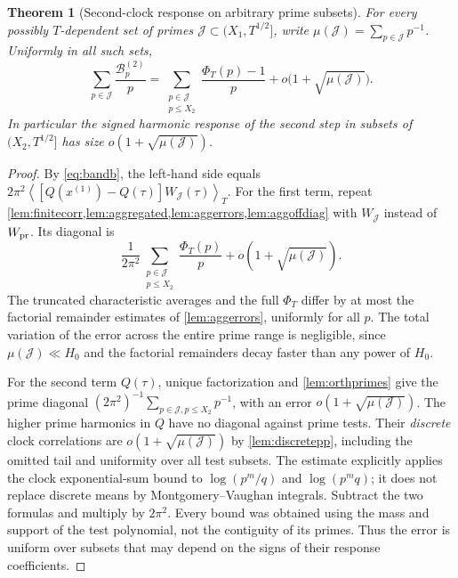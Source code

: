 \documentclass[11pt,reqno]{amsart}
\numberwithin{equation}{section}
\newtheorem{theorem}{Theorem}[section]
\newcommand{\av}[1]{\left\langle #1\right\rangle_T}
\begin{document}
\begin{theorem}[Second-clock response on arbitrary prime subsets]
\label{thm:secondresponse}
For every possibly $T$-dependent set of primes
$\mathcal J\subset(X_1,T^{1/2}]$, write
$\mu(\mathcal J)=\sum_{p\in\mathcal J}p^{-1}$.  Uniformly in
\emph{all} such sets,
\begin{equation}\label{eq:secondresponse}
\sum_{p\in\mathcal J}\frac{\mathcal B_p^{(2)}}p
=\sum_{\substack{p\in\mathcal J\\p\le X_2}}
\frac{\Phi_T(p)-1}{p}
 +o\bigl(1+\sqrt{\mu(\mathcal J)}\bigr).
\end{equation}
In particular the signed harmonic response of the second step in
subsets of $(X_2,T^{1/2}]$ has size
$o(1+\sqrt{\mu(\mathcal J)})$.
\end{theorem}
\begin{proof}
By \eqref{eq:bandb}, the left-hand side equals
$2\pi^2\av{[Q(x^{(1)})-Q(\tau)]W_{\mathcal J}(\tau)}$.
For the first term, repeat
\cref{lem:finitecorr,lem:aggregated,lem:aggerrors,lem:aggoffdiag}
with $W_{\mathcal J}$ instead of $W_{\rm pr}$.
Its diagonal is
\[
\frac1{2\pi^2}\sum_{\substack{p\in\mathcal J\\p\le X_2}}
\frac{\Phi_T(p)}p
 +o(1+\sqrt{\mu(\mathcal J)}).
\]
The truncated characteristic averages and the full $\Phi_T$
differ by at most the factorial remainder estimates of
\cref{lem:aggerrors}, uniformly for all $p$.
The total variation of the error across the entire prime range
is negligible, since $\mu(\mathcal J)\ll H_0$ and the
factorial remainders decay faster than any power of $H_0$.

For the second term $Q(\tau)$, unique factorization and
\cref{lem:orthprimes} give the prime diagonal
$(2\pi^2)^{-1}\sum_{p\in\mathcal J,p\le X_2}p^{-1}$,
with an error $o(1+\sqrt{\mu(\mathcal J)})$.
The higher prime harmonics in $Q$ have no diagonal
against prime tests. Their \emph{discrete} clock correlations
are $o(1+\sqrt{\mu(\mathcal J)})$ by
\cref{lem:discretepp}, including the omitted tail and
uniformity over all test subsets. The estimate explicitly
applies the clock exponential-sum bound to
$\log(p^m/q)$ and $\log(p^mq)$; it does not
replace discrete means by Montgomery--Vaughan integrals.
Subtract the two formulas and multiply by $2\pi^2$.
Every bound was obtained using the mass and support of the test
polynomial, not the contiguity of its primes.  Thus the error
is uniform over subsets that may depend on the signs of their
response coefficients.
\end{proof}
\end{document}
